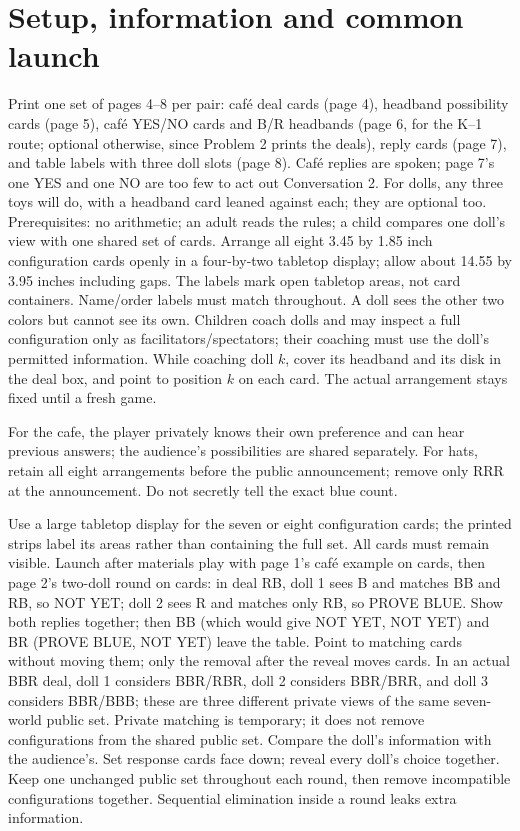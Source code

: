\documentclass[11pt,letterpaper]{article}
\begin{document}
\section*{Setup, information and common launch}
Print one set of pages 4--8 per pair: café deal cards (page 4), headband possibility cards (page 5), café YES/NO cards and B/R headbands (page 6, for the K--1 route; optional otherwise, since Problem 2 prints the deals), reply cards (page 7), and table labels with three doll slots (page 8). Café replies are spoken; page 7's one YES and one NO are too few to act out Conversation 2. For dolls, any three toys will do, with a headband card leaned against each; they are optional too. Prerequisites: no arithmetic; an adult reads the rules; a child compares one doll's view with one shared set of cards. Arrange all eight 3.45 by 1.85 inch configuration cards openly in a four-by-two tabletop display; allow about 14.55 by 3.95 inches including gaps. The labels mark open tabletop areas, not card containers. Name/order labels must match throughout. A doll sees the other two colors but cannot see its own. Children coach dolls and may inspect a full configuration only as facilitators/spectators; their coaching must use the doll's permitted information. While coaching doll $k$, cover its headband and its disk in the deal box, and point to position $k$ on each card. The actual arrangement stays fixed until a fresh game.

For the cafe, the player privately knows their own preference and can hear previous answers; the audience's possibilities are shared separately. For hats, retain all eight arrangements before the public announcement; remove only RRR at the announcement. Do not secretly tell the exact blue count.

Use a large tabletop display for the seven or eight configuration cards; the printed strips label its areas rather than containing the full set. All cards must remain visible. Launch after materials play with page 1's café example on cards, then page 2's two-doll round on cards: in deal RB, doll 1 sees B and matches BB and RB, so NOT YET; doll 2 sees R and matches only RB, so PROVE BLUE. Show both replies together; then BB (which would give NOT YET, NOT YET) and BR (PROVE BLUE, NOT YET) leave the table. Point to matching cards without moving them; only the removal after the reveal moves cards. In an actual BBR deal, doll 1 considers BBR/RBR, doll 2 considers BBR/BRR, and doll 3 considers BBR/BBB; these are three different private views of the same seven-world public set. Private matching is temporary; it does not remove configurations from the shared public set. Compare the doll's information with the audience's. Set response cards face down; reveal every doll's choice together. Keep one unchanged public set throughout each round, then remove incompatible configurations together. Sequential elimination inside a round leaks extra information.
\end{document}
